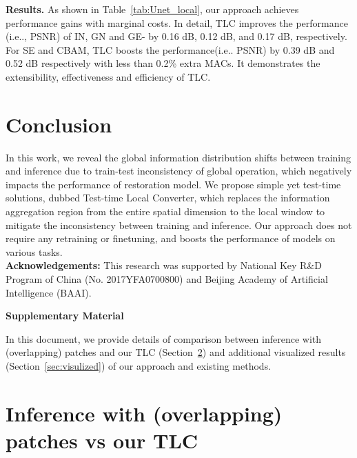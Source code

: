 \documentclass[runningheads]{llncs}
\makeatletter
\DeclareRobustCommand\onedot{\futurelet\@let@token\@onedot}
\def\@onedot{\ifx\@let@token.\else.\null\fi\xspace}
\def\ie{i.e\onedot}
\makeatother
\begin{document}
\textbf{Results.} 
As shown in Table~\ref{tab:Unet_local}, our approach achieves performance gains with marginal costs. In detail, TLC improves the performance (\ie, PSNR) of IN, GN and GE- by 0.16 dB, 0.12 dB, and 0.17 dB, respectively. For SE and CBAM, TLC boosts the performance(\ie PSNR) by 0.39 dB and 0.52 dB respectively with less than 0.2\% extra MACs. It demonstrates the extensibility, effectiveness and efficiency of TLC. \section{Conclusion}
In this work, we reveal the global information distribution shifts between training and inference due to train-test inconsistency of global operation, which negatively impacts the performance of restoration model. We propose simple yet test-time solutions, dubbed Test-time Local Converter, which replaces the information aggregation region from the entire spatial dimension to the local window to mitigate the inconsistency between training and inference. Our approach does not require any retraining or finetuning, and boosts the performance of models on various tasks. ~\\

\noindent\textbf{Acknowledgements:} This research was supported by National Key R\&D Program of China (No. 2017YFA0700800) and Beijing Academy of Artificial Intelligence (BAAI).
 \clearpage
\appendix

\noindent\large\textbf{Supplementary Material}
~\\


\setcounter{table}{0}
\renewcommand{\thetable}{A\arabic{table}}
\setcounter{figure}{0}
\renewcommand{\thefigure}{A\arabic{figure}}


In this document, we provide details of comparison between inference with (overlapping) patches and our TLC (Section~\ref{sec:patches_vs_tlc}) and additional visualized results (Section~\ref{sec:visulized}) of our approach and existing methods.

\section{Inference with (overlapping) patches vs our TLC}
\label{sec:patches_vs_tlc}
\end{document}
